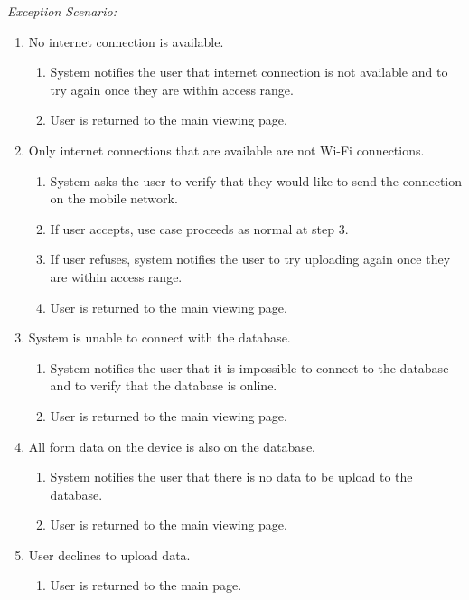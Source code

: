 \documentclass[twoside,letterpaper]{article}
\begin{document}
{\color{black} \textit{Exception Scenario:}}
\begin{enumerate}
\item No internet connection is available.
\begin{enumerate}
\item System notifies the user that internet connection is not available and to try again once they are within access range.
\item User is returned to the main viewing page.
\end{enumerate}

\item Only internet connections that are available are not Wi-Fi connections.
\begin{enumerate}
\item System asks the user to verify that they would like to send the connection on the mobile network.
\item If user accepts, use case proceeds as normal at step 3.
\item If user refuses, system notifies the user to try uploading again once they are within access range.
\item User is returned to the main viewing page.
\end{enumerate}

\item System is unable to connect with the database.
\begin{enumerate}
\item System notifies the user that it is impossible to connect to the database and to verify that the database is online.
\item User is returned to the main viewing page.
\end{enumerate}

\item All form data on the device is also on the database.
\begin{enumerate}
\item System notifies the user that there is no data to be upload to the database.
\item User is returned to the main viewing page.
\end{enumerate}

\item User declines to upload data.
\begin{enumerate}
\item User is returned to the main page.
\end{enumerate}


\end{enumerate}
\end{document}
